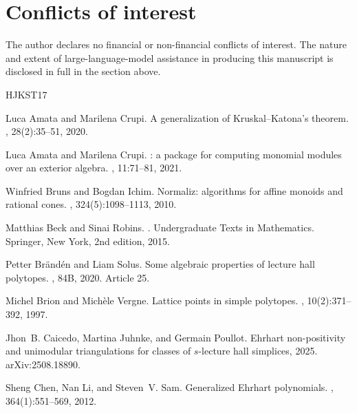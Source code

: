 \documentclass[11pt, a4paper, abstract=yes]{scrartcl}
\theoremstyle{definition}
\theoremstyle{remark}
\theoremstyle{plain}
\theoremstyle{remark}
\theoremstyle{plain}
\begin{document}
\section*{Conflicts of interest}
\label{sec:org6ed2b0c}
The author declares no financial or non-financial conflicts of interest. The nature and extent of
large-language-model assistance in producing this manuscript is disclosed in full in the section
above.
\newcommand{\etalchar}[1]{$^{#1}$}
\begin{thebibliography}{HJKST17}

Luca Amata and Marilena Crupi.
\newblock A generalization of {K}ruskal--{K}atona's theorem.
, 28(2):35--51, 2020.

Luca Amata and Marilena Crupi.
: a package for computing monomial modules over an
  exterior algebra.
, 11:71--81, 2021.

Winfried Bruns and Bogdan Ichim.
\newblock Normaliz: algorithms for affine monoids and rational cones.
, 324(5):1098--1113, 2010.

Matthias Beck and Sinai Robins.
.
\newblock Undergraduate Texts in Mathematics. Springer, New York, 2nd edition,
  2015.

Petter Br{\"a}nd{\'e}n and Liam Solus.
\newblock Some algebraic properties of lecture hall polytopes.
, 84B, 2020.
\newblock Article 25.

Michel Brion and Mich{\`e}le Vergne.
\newblock Lattice points in simple polytopes.
, 10(2):371--392,
  1997.

Jhon~B. Caicedo, Martina Juhnke, and Germain Poullot.
\newblock Ehrhart non-positivity and unimodular triangulations for classes of
  \(s\)-lecture hall simplices, 2025.
\newblock arXiv:2508.18890.

Sheng Chen, Nan Li, and Steven~V. Sam.
\newblock Generalized {E}hrhart polynomials.
,
  364(1):551--569, 2012.


\end{thebibliography}
\end{document}
